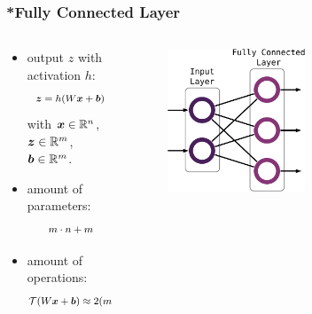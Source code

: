 \begin{frame}
  \frametitle{*Fully Connected Layer}
  \begin{columns}
    \begin{column}{0.45\textwidth}
      \begin{itemize}
        \item output $z$ with activation $h$:
        \begin{equation*}
          \footnotesize
          \begin{aligned}
            \bm{z} = h(W \bm{x} + \bm{b})
          \end{aligned}
        \end{equation*}
        {\scriptsize with $\bm{x} \in \mathbb{R}^n$, $\bm{z} \in \mathbb{R}^m$, $\bm{b} \in \mathbb{R}^m$.}
        \vspace{0.2cm}
        \item amount of parameters:
        \begin{equation*}
          \footnotesize
          \begin{aligned}
            m \cdot n + m
          \end{aligned}
        \end{equation*}
        \item amount of operations:
        \begin{equation*}
          \footnotesize
          \begin{aligned}
            \mathcal{T}(W \bm{x} + \bm{b}) \approx 2 (m \cdot n) + m
          \end{aligned}
        \end{equation*}
      \end{itemize}
    \end{column}
    \begin{column}{0.55\textwidth}
      \vspace{0.75cm}
      \centering
      \begin{figure} \includegraphics[width=0.55\textwidth]{../4_nn/figs/nn_theory_fc.pdf} \end{figure}
      \vfill
    \end{column}
  \end{columns}
\end{frame}

